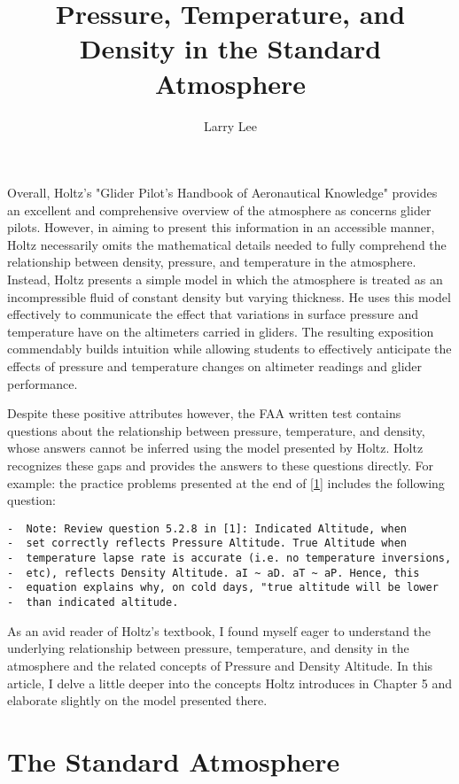 \documentclass[10pt,a4paper]{article}
\author{Larry Lee}
\title{Pressure, Temperature, and Density in the Standard Atmosphere}
\begin{document}
\maketitle
\begin{abstract}
\end{abstract}
Overall, Holtz's "Glider Pilot's Handbook of Aeronautical Knowledge" provides an excellent and comprehensive overview of the atmosphere as concerns glider pilots. However, in aiming to present this information in an accessible manner, Holtz necessarily omits the mathematical details needed to fully comprehend the relationship between density, pressure, and temperature in the atmosphere. Instead, Holtz presents a simple model in which the atmosphere is treated as an incompressible fluid of constant density but varying thickness. He uses this model effectively to communicate the effect that variations in surface pressure and temperature have on the altimeters carried in gliders. The resulting exposition commendably builds intuition while allowing students to effectively anticipate the effects of pressure and temperature changes on altimeter readings and glider performance.

Despite these positive attributes however, the FAA written test contains questions about the relationship between pressure, temperature, and density, whose answers cannot be inferred using the model presented by Holtz. Holtz recognizes these gaps and provides the answers to these questions directly. For example: the practice problems presented at the end of \ref{1} includes the following question:

\begin{verbatim}
-  Note: Review question 5.2.8 in [1]: Indicated Altitude, when
-  set correctly reflects Pressure Altitude. True Altitude when
-  temperature lapse rate is accurate (i.e. no temperature inversions,
-  etc), reflects Density Altitude. aI ~ aD. aT ~ aP. Hence, this
-  equation explains why, on cold days, "true altitude will be lower
-  than indicated altitude.
\end{verbatim}

As an avid reader of Holtz's textbook, I found myself eager to understand the underlying relationship between pressure, temperature, and density in the atmosphere and the related concepts of Pressure and Density Altitude. In this article, I delve a little deeper into the concepts Holtz introduces in Chapter 5 and elaborate slightly on the model presented there.

\section{The Standard Atmosphere}
\end{document}
